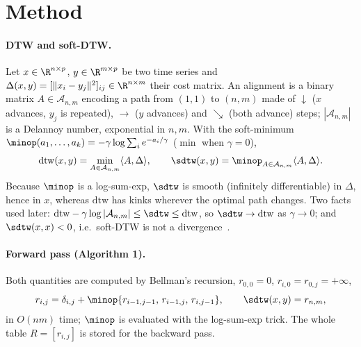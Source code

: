 \section{Method}

\paragraph{DTW and soft-DTW.}
Let $x\in\R^{n\times p}$, $y\in\R^{m\times p}$ be two time series and $\Delta(x,y)=[\|x_i-y_j\|^2]_{ij}\in\R^{n\times m}$ their cost matrix. An alignment is a binary matrix $A\in\mathcal A_{n,m}$ encoding a path from $(1,1)$ to $(n,m)$ made of $\downarrow$ ($x$ advances, $y_j$ is repeated), $\rightarrow$ ($y$ advances) and $\searrow$ (both advance) steps; $|\mathcal A_{n,m}|$ is a Delannoy number, exponential in $n,m$. With the soft-minimum $\minop(a_1,\dots,a_k)=-\gamma\log\sum_i e^{-a_i/\gamma}$ ($\min$ when $\gamma=0$),
\begin{equation}
\mathrm{dtw}(x,y)=\min_{A\in\mathcal A_{n,m}}\langle A,\Delta\rangle,\qquad
\sdtw(x,y)=\minop_{A\in\mathcal A_{n,m}}\langle A,\Delta\rangle .
\end{equation}
Because $\minop$ is a log-sum-exp, $\sdtw$ is smooth (infinitely differentiable) in $\Delta$, hence in $x$, whereas $\mathrm{dtw}$ has kinks wherever the optimal path changes. Two facts used later: $\mathrm{dtw}-\gamma\log|\mathcal A_{n,m}|\le\sdtw\le\mathrm{dtw}$, so $\sdtw\to\mathrm{dtw}$ as $\gamma\to0$; and $\sdtw(x,x)<0$, i.e.\ soft-DTW is not a divergence~\cite{blondel2021differentiable}.

\paragraph{Forward pass (Algorithm 1).}
Both quantities are computed by Bellman's recursion, $r_{0,0}=0$, $r_{i,0}=r_{0,j}=+\infty$,
\begin{equation}
r_{i,j}=\delta_{i,j}+\minop\{r_{i-1,j-1},\,r_{i-1,j},\,r_{i,j-1}\},\qquad \sdtw(x,y)=r_{n,m},
\end{equation}
in $O(nm)$ time; $\minop$ is evaluated with the log-sum-exp trick. The whole table $R=[r_{i,j}]$ is stored for the backward pass.

